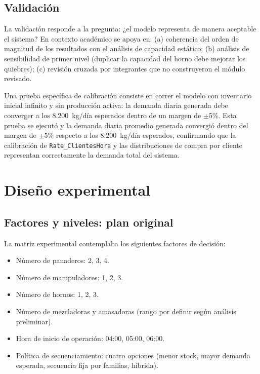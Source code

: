 \documentclass[12pt]{article}
\begin{document}
\subsection{Validación}

La validación responde a la pregunta: ¿el modelo representa de manera aceptable el sistema? En contexto académico se apoya en: (a) coherencia del orden de magnitud de los resultados con el análisis de capacidad estático; (b) análisis de sensibilidad de primer nivel (duplicar la capacidad del horno debe mejorar los quiebres); (c) revisión cruzada por integrantes que no construyeron el módulo revisado.

Una prueba específica de calibración consiste en correr el modelo con inventario inicial infinito y sin producción activa: la demanda diaria generada debe converger a los 8.200~kg/día esperados dentro de un margen de $\pm$5\%. Esta prueba se ejecutó y la demanda diaria promedio generada convergió dentro del margen de $\pm$5\% respecto a los 8.200~kg/día esperados, confirmando que la calibración de \texttt{Rate\_ClientesHora} y las distribuciones de compra por cliente representan correctamente la demanda total del sistema.

\newpage
\section{Diseño experimental}

\subsection{Factores y niveles: plan original}

La matriz experimental contemplaba los siguientes factores de decisión:

\begin{itemize}
  \item Número de panaderos: 2, 3, 4.
  \item Número de manipuladores: 1, 2, 3.
  \item Número de hornos: 1, 2, 3.
  \item Número de mezcladoras y amasadoras (rango por definir según análisis preliminar).
  \item Hora de inicio de operación: 04:00, 05:00, 06:00.
  \item Política de secuenciamiento: cuatro opciones (menor stock, mayor demanda esperada, secuencia fija por familias, híbrida).
\end{itemize}
\end{document}
